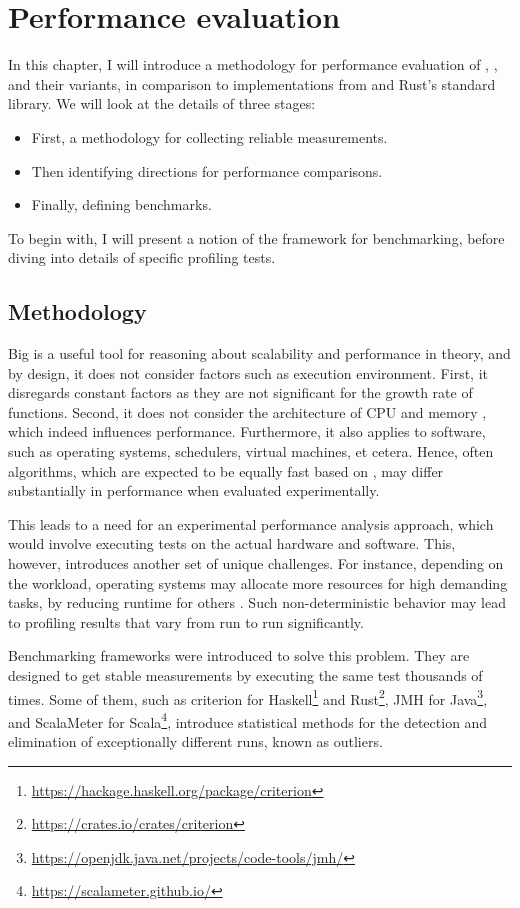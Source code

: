 \chapter{Performance evaluation}
In this chapter, I will introduce a methodology for performance evaluation of \rrbvec{}, \pvec{}, and their variants, in comparison to implementations from \imrsvec{} and Rust's standard library. We will look at the details of three stages:

\begin{itemize}
    \item First, a methodology for collecting reliable measurements.
    \item Then identifying directions for performance comparisons.
    \item Finally, defining benchmarks.
\end{itemize}

To begin with, I will present a notion of the framework for benchmarking, before diving into details of specific profiling tests.

\section{Methodology}
Big \bigochar{} is a useful tool for reasoning about scalability and performance in theory, and by design, it does not consider factors such as execution environment. First, it disregards constant factors as they are not significant for the growth rate of functions. Second, it does not consider the architecture of CPU and memory \cite{what-programmer-should-know-about-memory}, which indeed influences performance. Furthermore, it also applies to software, such as operating systems, schedulers, virtual machines, et cetera. Hence, often algorithms, which are expected to be equally fast based on \bigochar{}, may differ substantially in performance when evaluated experimentally.

This leads to a need for an experimental performance analysis approach, which would involve executing tests on the actual hardware and software. This, however, introduces another set of unique challenges. For instance, depending on the workload, operating systems may allocate more resources for high demanding tasks, by reducing runtime for others \cite{statistically-rigorous-java-performance-evaluation}. Such non-deterministic behavior may lead to profiling results that vary from run to run significantly.

Benchmarking frameworks were introduced to solve this problem. They are designed to get stable measurements by executing the same test thousands of times. Some of them, such as criterion for Haskell\footnote{\url{https://hackage.haskell.org/package/criterion}} and Rust\footnote{\url{https://crates.io/crates/criterion}}, JMH for Java\footnote{\url{https://openjdk.java.net/projects/code-tools/jmh/}}, and ScalaMeter for Scala\footnote{\url{https://scalameter.github.io/}}, introduce statistical methods for the detection and elimination of exceptionally different runs, known as outliers.

